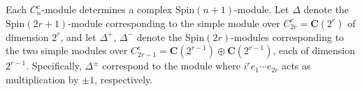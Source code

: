 Each $C_n^c$-module determines a complex $\text{Spin}(n+1)$-module. Let $\Delta$ denote the $\text{Spin}(2r+1)$-module corresponding to the simple module over $C_{2r}^c = \mathbf{C}(2^r)$ of dimension $2^r$, and let $\Delta^+$, $\Delta^-$ denote the $\text{Spin}(2r)$-modules corresponding to the two simple modules over $C_{2r-1}^c = \mathbf{C}(2^{r-1}) \oplus \mathbf{C}(2^{r-1})$, each of dimension $2^{r-1}$. Specifically, $\Delta^\pm$ correspond to the module where $i^r e_1 \cdots e_{2r}$ acts as multiplication by $\pm 1$, respectively.
